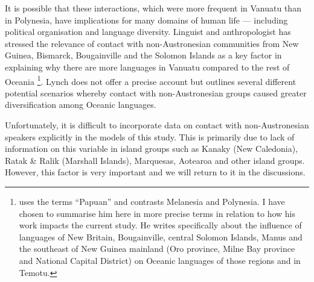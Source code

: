\documentclass[unnumsec,webpdf,modern,medium]{oup-authoring-template}
\begin{document}
It is possible that these interactions, which were more frequent in Vanuatu than in Polynesia, have implications for many domains of human life --- including political organisation and language diversity. Linguist and anthropologist \citet[104]{lynch1981melanesian} has stressed the relevance of contact with non-Austronesian communities from New Guinea, Bismarck, Bougainville and the Solomon Islands as a key factor in explaining why there are more languages in Vanuatu compared to the rest of Oceania \footnote{\citet{lynch1981melanesian} uses the terms ``Papuan'' and contrasts Melanesia and Polynesia. I have chosen to summarise him here in more precise terms in relation to how his work impacts the current study. He writes specifically about the influence of languages of New Britain, Bougainville, central Solomon Islands, Manus and the southeast of New Guinea mainland (Oro province, Milne Bay province and National Capital District) on Oceanic languages of those regions and in Temotu.}. Lynch does not offer a precise account but outlines several different potential scenarios whereby contact with non-Austronesian groups caused greater diversification among Oceanic languages.

Unfortunately, it is difficult to incorporate data on contact with non-Austronesian speakers explicitly in the models of this study. This is primarily due to lack of information on this variable in island groups such as Kanaky (New Caledonia), Ratak \& Ralik (Marshall Islands), Marquesas, Aotearoa and other island groups. However, this factor is very important and we will return to it in the discussions.



\end{document}
